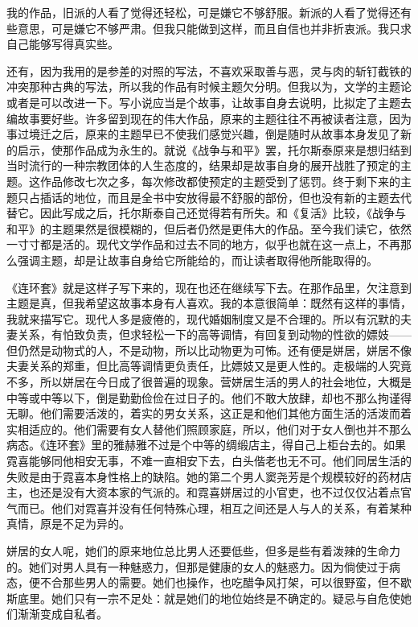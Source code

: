 \par 我的作品，旧派的人看了觉得还轻松，可是嫌它不够舒服。新派的人看了觉得还有些意思，可是嫌它不够严肃。但我只能做到这样，而且自信也并非折衷派。我只求自己能够写得真实些。
\par 还有，因为我用的是参差的对照的写法，不喜欢采取善与恶，灵与肉的斩钉截铁的冲突那种古典的写法，所以我的作品有时候主题欠分明。但我以为，文学的主题论或者是可以改进一下。写小说应当是个故事，让故事自身去说明，比拟定了主题去编故事要好些。许多留到现在的伟大作品，原来的主题往往不再被读者注意，因为事过境迁之后，原来的主题早已不使我们感觉兴趣，倒是随时从故事本身发见了新的启示，使那作品成为永生的。就说《战争与和平》罢，托尔斯泰原来是想归结到当时流行的一种宗教团体的人生态度的，结果却是故事自身的展开战胜了预定的主题。这作品修改七次之多，每次修改都使预定的主题受到了惩罚。终于剩下来的主题只占插话的地位，而且是全书中安放得最不舒服的部份，但也没有新的主题去代替它。因此写成之后，托尔斯泰自己还觉得若有所失。和《复活》比较，《战争与和平》的主题果然是很模糊的，但后者仍然是更伟大的作品。至今我们读它，依然一寸寸都是活的。现代文学作品和过去不同的地方，似乎也就在这一点上，不再那么强调主题，却是让故事自身给它所能给的，而让读者取得他所能取得的。
\par 《连环套》就是这样子写下来的，现在也还在继续写下去。在那作品里，欠注意到主题是真，但我希望这故事本身有人喜欢。我的本意很简单：既然有这样的事情，我就来描写它。现代人多是疲倦的，现代婚姻制度又是不合理的。所以有沉默的夫妻关系，有怕致负责，但求轻松一下的高等调情，有回复到动物的性欲的嫖妓——但仍然是动物式的人，不是动物，所以比动物更为可怖。还有便是姘居，姘居不像夫妻关系的郑重，但比高等调情更负责任，比嫖妓又是更人性的。走极端的人究竟不多，所以姘居在今日成了很普遍的现象。营姘居生活的男人的社会地位，大概是中等或中等以下，倒是勤勤俭俭在过日子的。他们不敢大放肆，却也不那么拘谨得无聊。他们需要活泼的，着实的男女关系，这正是和他们其他方面生活的活泼而着实相适应的。他们需要有女人替他们照顾家庭，所以，他们对于女人倒也并不那么病态。《连环套》里的雅赫雅不过是个中等的绸缎店主，得自己上柜台去的。如果霓喜能够同他相安无事，不难一直相安下去，白头偕老也无不可。他们同居生活的失败是由于霓喜本身性格上的缺陷。她的第二个男人窦尧芳是个规模较好的药材店主，也还是没有大资本家的气派的。和霓喜姘居过的小官吏，也不过仅仅沾着点官气而已。他们对霓喜并没有任何特殊心理，相互之间还是人与人的关系，有着某种真情，原是不足为异的。
\par 姘居的女人呢，她们的原来地位总比男人还要低些，但多是些有着泼辣的生命力的。她们对男人具有一种魅惑力，但那是健康的女人的魅惑力。因为倘使过于病态，便不合那些男人的需要。她们也操作，也吃醋争风打架，可以很野蛮，但不歇斯底里。她们只有一宗不足处：就是她们的地位始终是不确定的。疑忌与自危使她们渐渐变成自私者。
